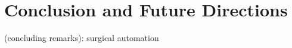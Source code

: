 \chapter{Conclusion and Future Directions} \label{chap:chap-6}

\alert{(concluding remarks): surgical automation}

